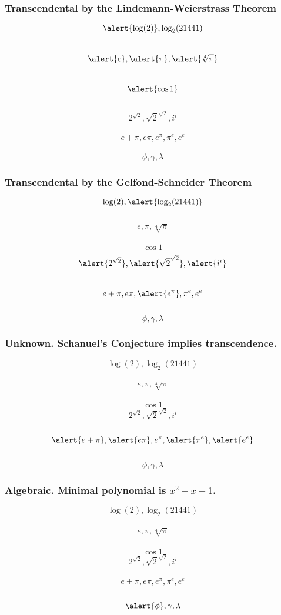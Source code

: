\documentclass{beamer}
\begin{document}
\begin{frame}
    \frametitle{Transcendental by the Lindemann-Weierstrass Theorem}
    \[\alert{\log(2)}, \log_{2}(21441)\] \\ \[\alert{e}, \alert{\pi}, \alert{\sqrt[4]{\pi}}\] \\ \[\alert{\cos{1}}\] \\ \[2^{\sqrt{2}}, {\sqrt{2}}^{\sqrt{2}}, {i}^{i}\] \\ \[e + \pi, e\pi, e^{\pi}, {\pi}^{e}, {e}^{e}\] \\ \[\phi, \gamma, \lambda\]
\end{frame}

\begin{frame}
	\frametitle{Transcendental by the Gelfond-Schneider Theorem}
	
    \[\log(2), \alert{\log_{2}(21441)}\] \\ \[e, \pi, \sqrt[4]{\pi}\] \\ \[\cos{1}\] \[\alert{2^{\sqrt{2}}}, \alert{{\sqrt{2}}^{\sqrt{2}}}, \alert{{i}^{i}}\] \\ \[e + \pi, e\pi, \alert{e^{\pi}}, {\pi}^{e}, {e}^{e}\] \\ \[\phi, \gamma, \lambda\]
	
\end{frame}

\begin{frame}
	\frametitle{Unknown. Schanuel's Conjecture implies transcendence.}

    \[\log(2), \log_{2}(21441)\] \\ \[e, \pi, \sqrt[4]{\pi}\] \\ \[\cos{1}\] \[2^{\sqrt{2}}, {\sqrt{2}}^{\sqrt{2}}, {i}^{i}\] \\ \[\alert{e + \pi}, \alert{e\pi}, e^{\pi}, \alert{{\pi}^{e}}, \alert{{e}^{e}}\] \\ \[\phi, \gamma, \lambda\]
   
\end{frame}

\begin{frame}
	\frametitle{Algebraic. Minimal polynomial is $x^2 - x - 1$.}
	
    \[\log(2), \log_{2}(21441)\] \\ \[e, \pi, \sqrt[4]{\pi}\] \\ \[\cos{1}\] \[2^{\sqrt{2}}, {\sqrt{2}}^{\sqrt{2}}, {i}^{i}\] \\ \[e + \pi, e\pi, e^{\pi}, {\pi}^{e}, {e}^{e}\] \\ \[\alert{\phi}, \gamma, \lambda\]
	
\end{frame}
\end{document}
